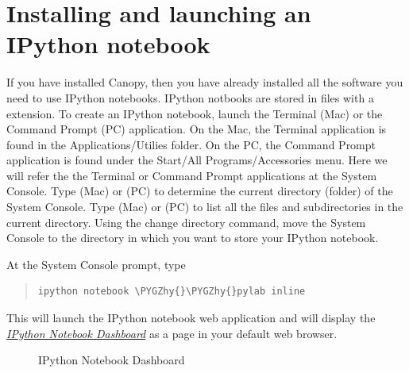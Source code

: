 \documentclass[letterpaper,10pt,english]{sphinxmanual}
\def\PYGZhy{\char`\-}
\begin{document}
\section{Installing and launching an IPython notebook}
\label{apdx2/apdx2_ipynb:installing-and-launching-an-ipython-notebook}
If you have installed Canopy, then you have already installed all the software you need to use IPython notebooks.  IPython notbooks are stored in files with a  extension.  To create an IPython notebook, launch the Terminal (Mac) or the Command Prompt (PC) application.  On the Mac, the Terminal application is found in the Applications/Utilies folder.  On the PC, the Command Prompt application is found under the Start/All Programs/Accessories menu.  Here we will refer the the Terminal or Command Prompt applications at the System Console.  Type  (Mac) or  (PC) to determine the current directory (folder) of the System Console.  Type  (Mac) or  (PC) to list all the files and subdirectories in the current directory.  Using the  change directory command, move the System Console to the directory in which you want to store your IPython notebook.

At the System Console prompt, type
\begin{quote}

\begin{Verbatim}[commandchars=\\\{\}]
ipython notebook \PYGZhy{}\PYGZhy{}pylab inline
\end{Verbatim}
\end{quote}

This will launch the IPython notebook web application and will display the {\hyperref[apdx2/apdx2_ipynb:fig-nbdashboard]{\emph{IPython Notebook Dashboard}}} as a page in your default web browser.
\begin{figure}[htbp]
\centering
\capstart

\caption{IPython Notebook Dashboard}\label{apdx2/apdx2_ipynb:fig-nbdashboard}\end{figure}
\end{document}
